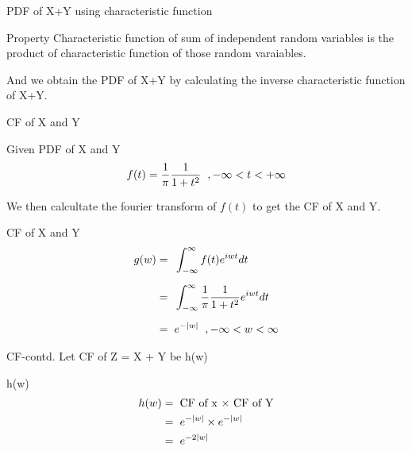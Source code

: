 \documentclass{beamer}
\providecommand{\abs}[1]{\vert#1\vert}
\begin{document}
\begin{frame}{PDF of X+Y using characteristic function}
  \begin{block}{Property}
    Characteristic function of sum of independent random variables is the product of characteristic function of those random varaiables.
  \end{block}
  And we obtain the PDF of X+Y by calculating the inverse characteristic function of X+Y.
\end{frame}
\begin{frame}{CF of X and Y}
  \begin{block}{Given PDF of X and Y}
    \begin{align}
      f(t) = \displaystyle\frac{1}{\pi} \frac{1}{1+{t}^2} \hspace{0.2cm},-\infty < t < +\infty\label{0.0.1}
    \end{align}
  \end{block}
  We then calcultate the fourier transform of $f(t)$ to get the CF of X and Y.
  \begin{block}{CF of X and Y}
    \begin{align}
      g(w) =\hspace{0.2cm} & \int_{-\infty}^{\infty}  f(t) {e}^{iwt} dt                                         \\[0.2cm]
      =\hspace{0.2cm}      & \int_{-\infty}^{\infty}  \displaystyle\frac{1}{\pi} \frac{1}{1+{t}^2} {e}^{iwt} dt \\[0.2cm]
      =\hspace{0.2cm}      & e^{-\abs{w}}\hspace{0.2cm}, -\infty<w<\infty
    \end{align}
  \end{block}
\end{frame}
\begin{frame}{CF-contd.}
  Let CF of Z = X + Y be h(w)
  \begin{block}{h(w)}
    \begin{align}
      h(w) = & \hspace{0.2cm} \text{CF of x $\times$ CF of Y}  \\
      =      & \hspace{0.2cm} e^{-\abs{w}} \times e^{-\abs{w}} \\
      =      & \hspace{0.2cm} {e}^{-2\abs{w}}
    \end{align}
  \end{block}
\end{frame}
\end{document}
